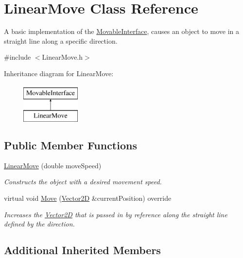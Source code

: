 \hypertarget{class_linear_move}{}\section{Linear\+Move Class Reference}
\label{class_linear_move}


A basic implementation of the \hyperlink{class_movable_interface}{Movable\+Interface}, causes an object to move in a straight line along a specific direction.  




{\ttfamily \#include $<$Linear\+Move.\+h$>$}

Inheritance diagram for Linear\+Move\+:\begin{figure}[H]
\begin{center}
\leavevmode
\includegraphics[height=2.000000cm]{df/d70/class_linear_move}
\end{center}
\end{figure}
\subsection*{Public Member Functions}
\begin{DoxyCompactItemize}
\item 
\hyperlink{class_linear_move_aa519e010d95eaaa372d3a45ba873d715}{Linear\+Move} (double move\+Speed)
\begin{DoxyCompactList}\small\item\em Constructs the object with a desired movement speed. \end{DoxyCompactList}\item 
virtual void \hyperlink{class_linear_move_a3a7b76828adfaefaaf7b687be499709d}{Move} (\hyperlink{class_vector2_d}{Vector2D} \&current\+Position) override
\begin{DoxyCompactList}\small\item\em Increases the \hyperlink{class_vector2_d}{Vector2D} that is passed in by reference along the straight line defined by the direction. \end{DoxyCompactList}\end{DoxyCompactItemize}
\subsection*{Additional Inherited Members}


